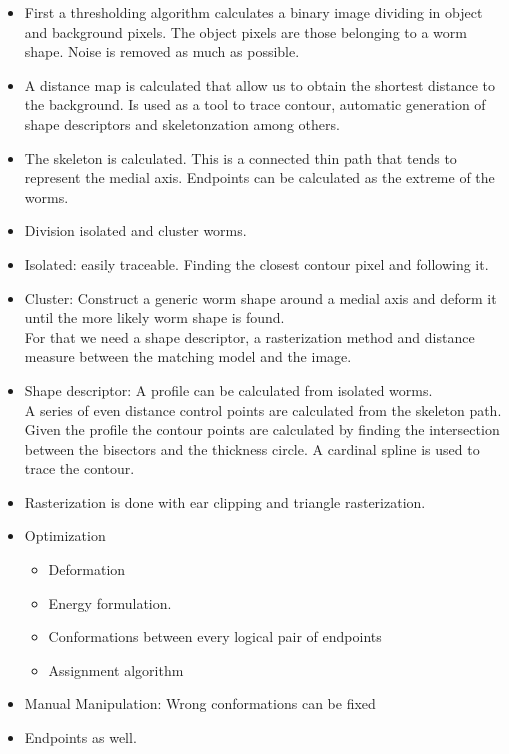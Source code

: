 \documentclass[12pt,letterpaper,oneside]{book}
\begin{document}
\begin{itemize}
\item First a thresholding algorithm calculates a binary image dividing
  in object and background pixels. The object pixels are those belonging
  to a worm shape.
  Noise is removed as much as possible.
\item A distance map is calculated that allow us to obtain the shortest
  distance to the background. Is used as a tool
  to trace contour, automatic generation of shape
  descriptors and skeletonzation among others.
\item The skeleton is calculated. This is a connected thin path that tends
to represent the medial axis. Endpoints can be calculated as the extreme 
of the worms. 
\item Division isolated and cluster worms.
\item Isolated: easily traceable. Finding the 
closest contour pixel and following it.
\item Cluster: Construct a generic worm shape around
a medial axis and deform it until the more likely
worm shape is found.\\ 
For that we need a shape descriptor, a rasterization
method and distance measure between the matching 
model and the image.
\end{itemize}

\begin{itemize}
\item Shape descriptor: A profile can be calculated
from isolated worms.\\
A series of even distance control points are
calculated from the skeleton path. Given the profile
the contour points are calculated by finding the 
intersection between the bisectors and the 
thickness circle. A cardinal spline is used to 
trace the contour.
\item Rasterization is done with ear clipping and
triangle rasterization.
\item Optimization
  \begin{itemize}
  \item Deformation
  \item Energy formulation.
  \item Conformations between every logical 
    pair of endpoints
  \item Assignment algorithm
  \end{itemize}
\end{itemize}

\begin{itemize}
\item Manual Manipulation: Wrong conformations
  can be fixed
\item Endpoints as well.
\end{itemize}
\end{document}
